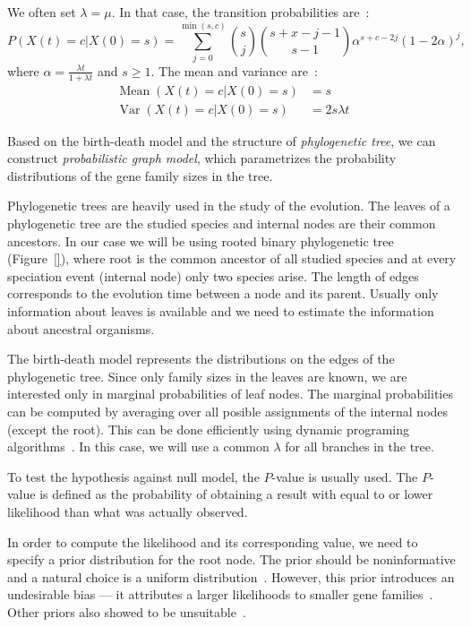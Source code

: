 We often set $\lambda = \mu$. In that case, the transition probabilities are~\cite{hahn2005estimating}:
$$P(X(t) = c | X(0) = s) = \sum_{j=0}^{\min(s, c)} {s \choose j}{s+x-j-1 \choose s-1}\alpha^{s+c-2j}{(1-2\alpha)}^j,$$
where $\alpha = \frac{\lambda t}{1+ \lambda t}$ and $s \geq 1$. The mean and variance are~\cite{hahn2005estimating}:
\begin{align*}
  \operatorname{Mean}(X(t) = c | X(0) = s) &= s\\
  \operatorname{Var}(X(t) = c | X(0) = s) &= 2s\lambda t
\end{align*}

Based on the birth-death model and the structure of \emph{phylogenetic tree}, we can construct \emph{probabilistic graph model}, which parametrizes the probability distributions of the gene family sizes in the tree.

Phylogenetic trees are heavily used in the study of the evolution. The leaves of a phylogenetic tree are the studied species and internal nodes are their common ancestors. In our case we will be using rooted binary phylogenetic tree (Figure~\ref{}), where root is the common ancestor of all studied species and at every speciation event (internal node) only two species arise. The length of edges corresponds to the evolution time between a node and its parent. Usually only information about leaves is available and we need to estimate the information about ancestral organisms.

The birth-death model represents the distributions on the edges of the phylogenetic tree. Since only family sizes in the leaves are known, we are interested only in marginal probabilities of leaf nodes. The marginal probabilities can be computed by averaging over all posible assignments of the internal nodes (except the root). This can be done efficiently using dynamic programing algorithms~\cite{felsenstein1981evolutionary}. In this case, we will use a common $\lambda$ for all branches in the tree.

To test the hypothesis against null model, the $P$-value is usually used. The $P$-value is defined as the probability of obtaining a result with equal to or lower likelihood than what was actually observed.

In order to compute the likelihood and its corresponding value, we need to specify a prior distribution for the root node. The prior should be noninformative and a natural choice is a uniform distribution~\cite{felsenstein1981evolutionary}. However, this prior introduces an undesirable bias --- it attributes a larger likelihoods to smaller gene families~\cite{hahn2005estimating}. Other priors also showed to be unsuitable~\cite{hahn2005estimating}.

